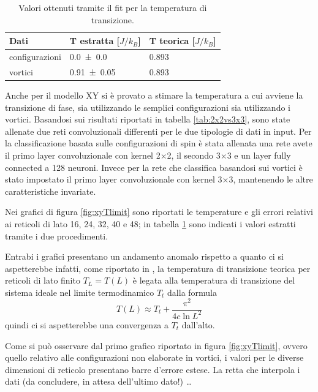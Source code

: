 \documentclass{article}
\begin{document}
\begin{table}[!ht]
\begin{center}
\begin{tabular}{lll}
\toprule
Dati & T estratta [$J/k_B$] & T teorica [$J/k_B$] \\
\midrule
configurazioni & \num{ 0.0 \pm 0.0} & \num{0.893}\\
vortici & \num{0.91 \pm0.05}  & \num{0.893} \\
\bottomrule
\end{tabular}
\end{center}
\caption{Valori ottenuti tramite il fit per la temperatura di transizione.}
\label{tab:Txy}
\end{table}

Anche per il modello XY si è provato a stimare la temperatura a cui avviene la transizione di fase, sia utilizzando le semplici configurazioni sia utilizzando i vortici.
Basandosi sui risultati riportati in tabella \ref{tab:2x2vs3x3}, sono state allenate due reti convoluzionali differenti per le due tipologie di dati in input.
Per la classificazione basata sulle configurazioni di spin è stata allenata una rete avete il primo layer convoluzionale con kernel 2$\times$2, il secondo 3$\times$3 e un layer fully connected a 128 neuroni.
Invece per la rete che classifica basandosi sui vortici è stato impostato il primo layer convoluzionale con kernel 3$\times$3, mantenendo le altre caratteristiche invariate.

Nei grafici di figura \ref{fig:xyTlimit} sono riportati le temperature e gli errori relativi ai reticoli di lato 16, 24, 32, 40 e 48; in tabella \ref{tab:Txy} sono indicati i valori estratti tramite i due procedimenti.

Entrabi i grafici presentano un andamento anomalo rispetto a quanto ci si aspetterebbe infatti, come riportato in \cite{melko}, la temperatura di transizione teorica per reticoli di lato finito $T_L=T(L)$ è legata alla temperatura di transizione del sistema ideale nel limite termodinamico $T_t$ dalla formula
\begin{equation}
T(L) \approx T_t + \frac{\pi^2}{4c \ln{L}^2}
\label{formula:TL}
\end{equation}
quindi ci si aspetterebbe una convergenza a $T_t$ dall'alto.

Come si può osservare dal primo grafico riportato in figura \ref{fig:xyTlimit}, ovvero quello relativo alle configurazioni non elaborate in vortici, i valori per le diverse dimensioni di reticolo presentano barre d'errore estese.
La retta che interpola i dati (da concludere, in attesa dell'ultimo dato!) \dots
\end{document}
